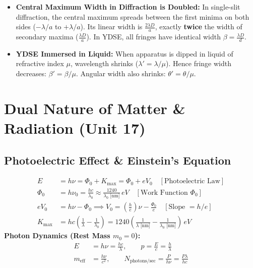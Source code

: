 \documentclass[10pt,twoside,openright]{book}
\begin{document}
\begin{trapbox}
\begin{itemize}
  \item \textbf{Central Maximum Width in Diffraction is Doubled:} In single-slit diffraction, the central maximum spreads between the first minima on both sides ($-\lambda/a$ to $+\lambda/a$). Its linear width is $\frac{2\lambda D}{a}$, exactly \textbf{twice} the width of secondary maxima ($\frac{\lambda D}{a}$). In YDSE, all fringes have identical width $\beta = \frac{\lambda D}{d}$.
  \item \textbf{YDSE Immersed in Liquid:} When apparatus is dipped in liquid of refractive index $\mu$, wavelength shrinks ($\lambda' = \lambda/\mu$). Hence fringe width decreases: $\beta' = \beta/\mu$. Angular width also shrinks: $\theta' = \theta/\mu$.
\end{itemize}
\end{trapbox}

\newpage

\section{Dual Nature of Matter \& Radiation (Unit 17)}

\subsection{Photoelectric Effect \& Einstein's Equation}

\begin{formulabox}
\begin{align}
  E &= h\nu = \Phi_0 + K_{\max} = \Phi_0 + e V_0 \quad [\text{Photoelectric Law}] \\
  \Phi_0 &= h\nu_0 = \frac{hc}{\lambda_0} \approx \frac{1240}{\lambda_0\text{ [nm]}}\,\si{eV} \quad [\text{Work Function } \Phi_0] \\
  e V_0 &= h\nu - \Phi_0 \implies V_0 = \left(\frac{h}{e}\right)\nu - \frac{\Phi_0}{e} \quad [\text{Slope } = h/e] \\
  K_{\max} &= hc\left(\frac{1}{\lambda} - \frac{1}{\lambda_0}\right) = 1240\left(\frac{1}{\lambda\text{ [nm]}} - \frac{1}{\lambda_0\text{ [nm]}}\right)\,\si{eV}
\end{align}
\textbf{Photon Dynamics (Rest Mass $m_0 = 0$):}
\begin{align}
  E &= h\nu = \frac{hc}{\lambda}, \qquad p = \frac{E}{c} = \frac{h}{\lambda} \\
  m_{\text{eff}} &= \frac{h\nu}{c^2}, \qquad N_{\text{photons/sec}} = \frac{P}{h\nu} = \frac{P\lambda}{hc}
\end{align}
\end{formulabox}
\end{document}

